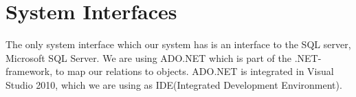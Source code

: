 \section{System Interfaces}
\label{sec:system_interfaces}
The only system interface which our system has is an interface to the SQL server, Microsoft SQL Server.
We are using ADO.NET which is part of the .NET-framework, to map our relations to objects.
ADO.NET is integrated in Visual Studio 2010, which we are using as IDE(Integrated Development Environment).